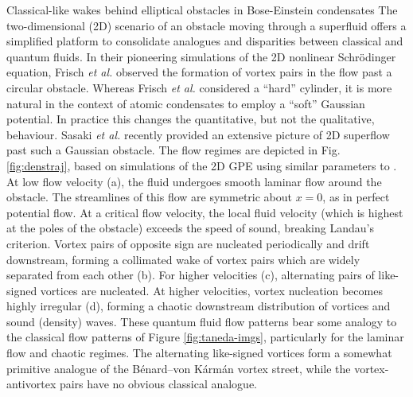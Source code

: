\begin{chapter}{\label{cha:wake}Classical-like wakes behind elliptical obstacles in Bose-Einstein condensates}
The two-dimensional (2D) scenario of an obstacle moving through a superfluid offers a simplified platform to consolidate analogues and disparities between classical and quantum fluids.  %
In their pioneering simulations of the 2D nonlinear Schr\"odinger equation, Frisch {\it et al.} \cite{frisch92} observed the formation of vortex pairs in the flow past a circular obstacle. Whereas Frisch {\it et al.} considered a ``hard'' cylinder, it is more natural in the context of atomic condensates to employ a ``soft'' Gaussian potential. In practice this changes the quantitative, but not the qualitative, behaviour.  Sasaki {\it et al.} \cite{saito10} recently provided an extensive picture of 2D superflow past such a Gaussian obstacle.   The flow regimes are depicted in Fig. \ref{fig:denstraj}, based on simulations of the 2D GPE using similar parameters to \cite{saito10}.   At low flow velocity (a), the fluid undergoes smooth laminar flow around the obstacle.  The streamlines of this flow are symmetric about $x=0$, as in perfect potential flow.  At a critical flow velocity, the local fluid velocity (which is highest at the poles of the obstacle) exceeds the speed of sound, breaking Landau's criterion.  Vortex pairs of opposite sign are nucleated periodically and drift downstream, forming a collimated wake of vortex pairs which are widely separated from each other (b).  For higher velocities (c), alternating pairs of like-signed vortices are nucleated.  At higher velocities, vortex nucleation becomes highly irregular (d), forming a chaotic downstream distribution of vortices and sound (density) waves.  These quantum fluid flow patterns bear some analogy to the classical flow patterns of Figure \ref{fig:taneda-imgs}, particularly for the laminar flow and chaotic regimes.  The alternating like-signed vortices form a somewhat primitive analogue of the B\'enard--von K\'arm\'an vortex street, while the vortex-antivortex pairs have no obvious classical analogue.  

\end{chapter}
